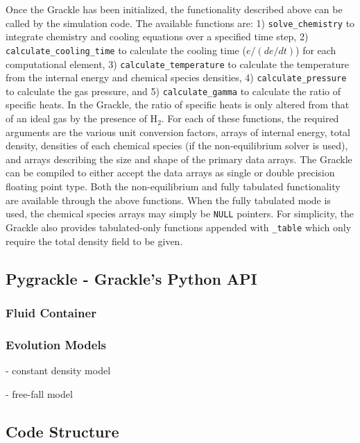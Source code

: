Once the Grackle has been initialized, the functionality described
above can be called by the simulation code.  The available functions
are: 1) \texttt{solve\_chemistry} to integrate chemistry and cooling
equations over a specified time step, 2)
\texttt{calculate\_cooling\_time} to calculate the cooling time
($e/(de/dt)$) for each computational element, 3)
\texttt{calculate\_temperature} to calculate the temperature from the
internal energy and chemical species densities, 4)
\texttt{calculate\_pressure} to calculate the gas pressure, and 5)
\texttt{calculate\_gamma} to calculate the ratio of specific heats.
In the Grackle, the ratio of specific heats is only altered from that
of an ideal gas by the presence of H$_{2}$.  For each of these
functions, the required arguments are the various unit conversion
factors, arrays of internal energy, total density, densities of each chemical
species (if the non-equilibrium solver is used), and arrays describing
the size and shape of the primary data arrays.  The Grackle can be
compiled to either accept the data arrays as single or double
precision floating point type.  Both the non-equilibrium and fully
tabulated functionality are available through the above functions.
When the fully tabulated mode is used, the chemical species arrays may
simply be \texttt{NULL} pointers.  For simplicity, the Grackle also
provides tabulated-only functions appended with \texttt{\_table} which
only require the total density field to be given.

\subsection{Pygrackle - Grackle's Python API}

\subsubsection{Fluid Container} \label{sec:pyfluid}

\subsubsection{Evolution Models} \label{sec:pyevolve}

- constant density model

- free-fall model

\subsection{Code Structure} \label{Code_Structure}

